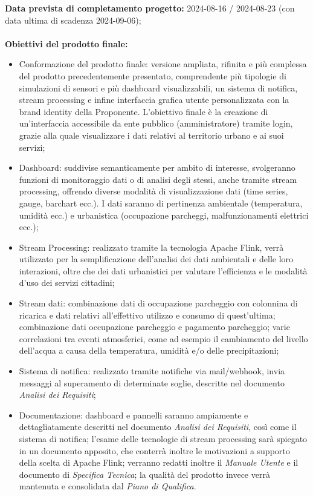 \documentclass[8pt]{article}
\begin{document}
\textbf{Data prevista di completamento progetto:} 2024-08-16 / 2024-08-23 (con data ultima di scadenza 2024-09-06); \\\\
\textbf{Obiettivi del prodotto finale:}
\begin{itemize}
\setlength\itemsep{0em}
    \item Conformazione del prodotto finale: versione ampliata, rifinita e più complessa del prodotto precedentemente presentato, comprendente più tipologie di simulazioni di sensori e più dashboard visualizzabili, un sistema di notifica, stream processing e infine interfaccia grafica utente personalizzata con la brand identity della Proponente. L'obiettivo finale è la creazione di un'interfaccia accessibile da ente pubblico (amministratore) tramite login, grazie alla quale visualizzare i dati relativi al territorio urbano e ai suoi servizi;
    \item Dashboard: suddivise semanticamente per ambito di interesse, svolgeranno funzioni di monitoraggio dati o di analisi degli stessi, anche tramite stream processing, offrendo diverse modalità di visualizzazione dati (time series, gauge, barchart ecc.). I dati saranno di pertinenza ambientale (temperatura, umidità ecc.) e urbanistica (occupazione parcheggi, malfunzionamenti elettrici ecc.);
    \item Stream Processing: realizzato tramite la tecnologia Apache Flink, verrà utilizzato per la semplificazione dell'analisi dei dati ambientali e delle loro interazioni, oltre che dei dati urbanistici per valutare l'efficienza e le modalità d'uso dei servizi cittadini;
    \item Stream dati: combinazione dati di occupazione parcheggio con colonnina di ricarica e dati relativi all'effettivo utilizzo e consumo di quest'ultima; combinazione dati occupazione parcheggio e pagamento parcheggio; varie correlazioni tra eventi atmosferici, come ad esempio il cambiamento del livello dell'acqua a causa della temperatura, umidità e/o delle precipitazioni;
    \item Sistema di notifica: realizzato tramite notifiche via mail/webhook, invia messaggi al superamento di determinate soglie, descritte nel documento \textit{Analisi dei Requisiti};
    \item Documentazione: dashboard e pannelli saranno ampiamente e dettagliatamente descritti nel documento \textit{Analisi dei Requisiti}, così come il sistema di notifica; l'esame delle tecnologie di stream processing sarà spiegato in un documento apposito, che conterrà inoltre le motivazioni a supporto della scelta di Apache Flink; verranno redatti inoltre il \textit{Manuale Utente} e il documento di \textit{Specifica Tecnica}; la qualità del prodotto invece verrà mantenuta e consolidata dal \textit{Piano di Qualifica}.
\end{itemize}
\end{document}
